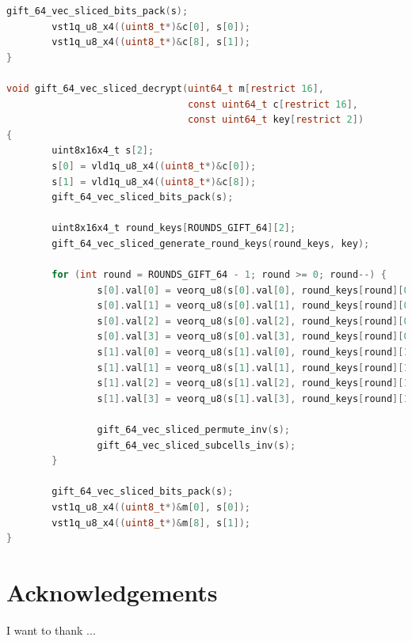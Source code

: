 \documentclass[12pt]{report}
\begin{document}
\begin{lstlisting}[language=c, caption={gift\_vec\_sliced.c}]
        gift_64_vec_sliced_bits_pack(s);
        vst1q_u8_x4((uint8_t*)&c[0], s[0]);
        vst1q_u8_x4((uint8_t*)&c[8], s[1]);
}

void gift_64_vec_sliced_decrypt(uint64_t m[restrict 16],
                                const uint64_t c[restrict 16],
                                const uint64_t key[restrict 2])
{
        uint8x16x4_t s[2];
        s[0] = vld1q_u8_x4((uint8_t*)&c[0]);
        s[1] = vld1q_u8_x4((uint8_t*)&c[8]);
        gift_64_vec_sliced_bits_pack(s);

        uint8x16x4_t round_keys[ROUNDS_GIFT_64][2];
        gift_64_vec_sliced_generate_round_keys(round_keys, key);

        for (int round = ROUNDS_GIFT_64 - 1; round >= 0; round--) {
                s[0].val[0] = veorq_u8(s[0].val[0], round_keys[round][0].val[0]);
                s[0].val[1] = veorq_u8(s[0].val[1], round_keys[round][0].val[1]);
                s[0].val[2] = veorq_u8(s[0].val[2], round_keys[round][0].val[2]);
                s[0].val[3] = veorq_u8(s[0].val[3], round_keys[round][0].val[3]);
                s[1].val[0] = veorq_u8(s[1].val[0], round_keys[round][1].val[0]);
                s[1].val[1] = veorq_u8(s[1].val[1], round_keys[round][1].val[1]);
                s[1].val[2] = veorq_u8(s[1].val[2], round_keys[round][1].val[2]);
                s[1].val[3] = veorq_u8(s[1].val[3], round_keys[round][1].val[3]);

                gift_64_vec_sliced_permute_inv(s);
                gift_64_vec_sliced_subcells_inv(s);
        }

        gift_64_vec_sliced_bits_pack(s);
        vst1q_u8_x4((uint8_t*)&m[0], s[0]);
        vst1q_u8_x4((uint8_t*)&m[8], s[1]);
}
\end{lstlisting}

\chapter*{Acknowledgements}

I want to thank ...

\printbibliography
\end{document}
